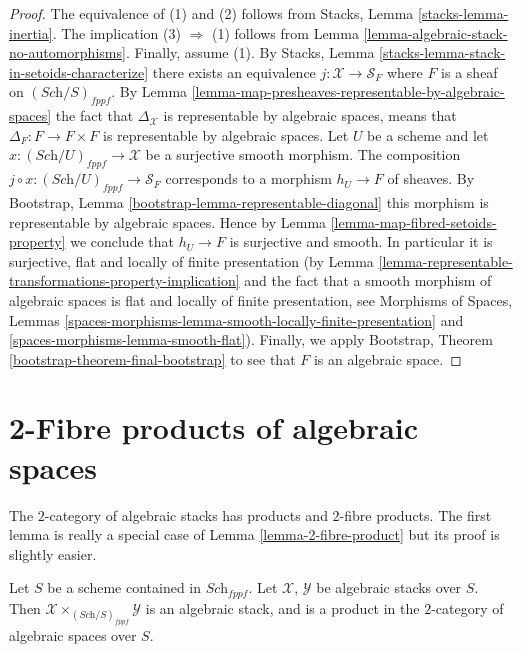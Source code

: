 \begin{proof}
The equivalence of (1) and (2) follows from
Stacks, Lemma \ref{stacks-lemma-inertia}.
The implication (3) $\Rightarrow$ (1) follows from
Lemma \ref{lemma-algebraic-stack-no-automorphisms}.
Finally, assume (1). By
Stacks, Lemma \ref{stacks-lemma-stack-in-setoids-characterize}
there exists an equivalence $j : \mathcal{X} \to \mathcal{S}_F$
where $F$ is a sheaf on $(\textit{Sch}/S)_{fppf}$.  By
Lemma \ref{lemma-map-presheaves-representable-by-algebraic-spaces}
the fact that $\Delta_\mathcal{X}$ is representable by algebraic
spaces, means that $\Delta_F : F \to F \times F$
is representable by algebraic spaces.
Let $U$ be a scheme and let $x : (\textit{Sch}/U)_{fppf} \to \mathcal{X}$
be a surjective smooth morphism. The composition
$j \circ x : (\textit{Sch}/U)_{fppf} \to \mathcal{S}_F$
corresponds to a morphism $h_U \to F$ of sheaves. By
Bootstrap, Lemma \ref{bootstrap-lemma-representable-diagonal}
this morphism is representable by algebraic spaces.
Hence by
Lemma \ref{lemma-map-fibred-setoids-property}
we conclude that $h_U \to F$ is surjective and smooth.
In particular it is surjective, flat and locally of finite presentation
(by
Lemma \ref{lemma-representable-transformations-property-implication}
and the fact that a smooth morphism of algebraic spaces is flat and
locally of finite presentation, see
Morphisms of Spaces,
Lemmas \ref{spaces-morphisms-lemma-smooth-locally-finite-presentation} and
\ref{spaces-morphisms-lemma-smooth-flat}).
Finally, we apply
Bootstrap, Theorem \ref{bootstrap-theorem-final-bootstrap}
to see that $F$ is an algebraic space.
\end{proof}






\section{2-Fibre products of algebraic spaces}
\label{section-2-fibre-products}

\noindent
The $2$-category of algebraic stacks has products and $2$-fibre products.
The first lemma is really a special case of
Lemma \ref{lemma-2-fibre-product}
but its proof is slightly easier.

\begin{lemma}
\label{lemma-product-spaces}
Let $S$ be a scheme contained in $\textit{Sch}_{fppf}$.
Let $\mathcal{X}$, $\mathcal{Y}$ be algebraic stacks over $S$.
Then $\mathcal{X} \times_{(\textit{Sch}/S)_{fppf}} \mathcal{Y}$
is an algebraic stack, and is a product in the $2$-category of
algebraic spaces over $S$.
\end{lemma}

